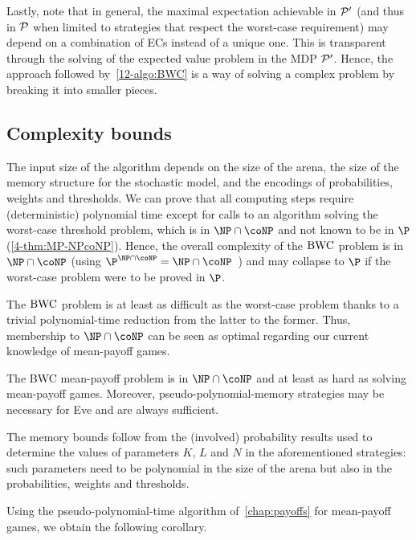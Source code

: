 \begin{example}
Lastly, note that in general, the maximal expectation achievable in ${\mathcal{P}}'$ (and thus in ${\mathcal{P}}$ when limited to strategies that respect the worst-case requirement) may depend on a combination of ECs instead of a unique one. This is transparent through the solving of the expected value problem in the MDP ${\mathcal{P}}'$. Hence, the approach followed by~\cref{12-algo:BWC} is a way of solving a complex problem by breaking it into smaller pieces.
\end{example}

\subsection*{Complexity bounds} The input size of the algorithm depends on the size of the arena, the size of the memory structure for the stochastic model, and the encodings of probabilities, weights and thresholds. We can prove that all computing steps require (deterministic) polynomial time except for calls to an algorithm solving the worst-case threshold problem, which is in $\NP \cap \coNP$ and not known to be in $\P$ (\cref{4-thm:MP-NPcoNP}). Hence, the overall complexity of the $\text{BWC}$ problem is in $\NP \cap \coNP$ (using $\P^{\NP \cap \coNP} = \NP \cap \coNP$~\cite{Brassard:1979}) and may collapse to $\P$ if the worst-case problem were to be proved in $\P$.

The $\text{BWC}$ problem is at least as difficult as the worst-case problem thanks to a trivial polynomial-time reduction from the latter to the former. Thus, membership to $\NP \cap \coNP$ can be seen as optimal regarding our current knowledge of mean-payoff games.

\begin{theorem}
\label{12-thm:bwcDecisionProblem}
The BWC mean-payoff problem is in $\NP \cap \coNP$ and at least as hard as solving mean-payoff games. Moreover, pseudo-polynomial-memory strategies may be necessary for Eve and are always sufficient.
\end{theorem}

The memory bounds follow from the (involved) probability results used to determine the values of parameters $K$, $L$ and $N$ in the aforementioned strategies: such parameters need to be polynomial in the size of the arena but also in the probabilities, weights and thresholds.

Using the pseudo-polynomial-time algorithm of~\cref{chap:payoffs} for mean-payoff games,  we obtain the following corollary.

